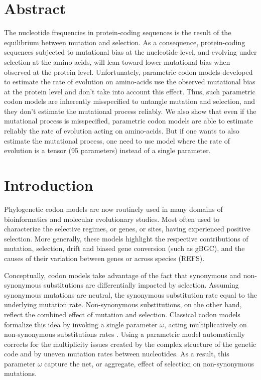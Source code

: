 \section{Abstract}

The nucleotide frequencies in protein-coding sequences is the result of the equilibrium between mutation and selection.
As a consequence, protein-coding sequences subjected to mutational bias at the nucleotide level, and evolving under selection at the amino-acids, will lean toward lower mutational bias when observed at the protein level.
Unfortunately, parametric \gls{codon} models developed to estimate the rate of evolution on amino-acids use the observed mutational bias at the protein level and don't take into account this effect.
Thus, such parametric \gls{codon} models are inherently misspecified to untangle mutation and selection, and they don’t estimate the mutational process reliably.
We also show that even if the mutational process is misspecified, parametric \gls{codon} models are able to estimate reliably the rate of evolution acting on amino-acids.
But if one wants to also estimate the mutational process, one need to use model where the rate of evolution is a tensor (95 parameters) instead of a single parameter.


\section{Introduction}

Phylogenetic codon models are now routinely used in many domains of bioinformatics and molecular evolutionary studies.
Most often used to characterize the selective regimes, or genes, or sites, having experienced positive selection.
More generally, these models highlight the respective contributions of mutation, selection, drift and biased gene conversion (such as gBGC), and the causes of their variation between genes or across species (REFS).

Conceptually, codon models take advantage of the fact that synonymous and non-synonymous substitutions are differentially impacted by selection.
Assuming synonymous mutations are neutral, the synonymous substitution rate equal to the underlying mutation rate.
Non-synonymous substitutions, on the other hand, reflect the combined effect of mutation and selection.
Classical codon models formalize this idea by invoking a single parameter $\omega$, acting multiplicatively on non-synonymous substitutions rates \citep{Muse1994, Goldman1994}.
Using a parametric model automatically corrects for the multiplicity issues created by the complex structure of the genetic code and by uneven mutation rates between nucleotides.
As a result, this parameter $\omega$ capture the net, or aggregate, effect of selection on non-synonymous mutations.

